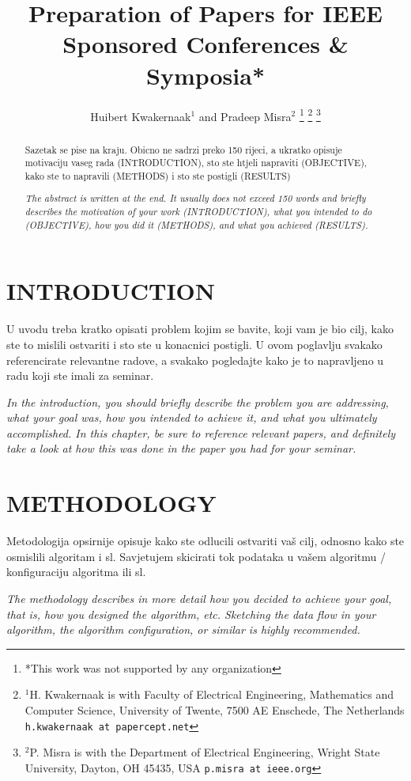 \documentclass[letterpaper, 10 pt, conference]{ieeeconf}  %
\title{\LARGE \bf
Preparation of Papers for IEEE Sponsored Conferences \& Symposia*
}
\author{Huibert Kwakernaak$^{1}$ and Pradeep Misra$^{2}$%
\thanks{*This work was not supported by any organization}%
\thanks{$^{1}$H. Kwakernaak is with Faculty of Electrical Engineering, Mathematics and Computer Science,
        University of Twente, 7500 AE Enschede, The Netherlands
        {\tt\small h.kwakernaak at papercept.net}}%
\thanks{$^{2}$P. Misra is with the Department of Electrical Engineering, Wright State University,
        Dayton, OH 45435, USA
        {\tt\small p.misra at ieee.org}}%
}
\begin{document}
\maketitle
\thispagestyle{empty}
\pagestyle{empty}


\begin{abstract}

Sazetak se pise na kraju. Obicno ne sadrzi preko 150 rijeci, a ukratko opisuje motivaciju vaseg rada (INTRODUCTION), sto ste htjeli napraviti (OBJECTIVE), kako ste to napravili (METHODS) i sto ste postigli (RESULTS)

\textit{The abstract is written at the end. It usually does not exceed 150 words and briefly describes the motivation of your work (INTRODUCTION), what you intended to do (OBJECTIVE), how you did it (METHODS), and what you achieved (RESULTS).}

\end{abstract}


\section{\textbf{INTRODUCTION}}

U uvodu treba kratko opisati problem kojim se bavite, koji vam je bio cilj, kako ste to mislili ostvariti i sto ste u konacnici postigli. U ovom poglavlju svakako referencirate relevantne radove, a svakako pogledajte kako je to napravljeno u radu koji ste imali za seminar.

\textit{In the introduction, you should briefly describe the problem you are addressing, what your goal was, how you intended to achieve it, and what you ultimately accomplished. In this chapter, be sure to reference relevant papers, and definitely take a look at how this was done in the paper you had for your seminar.}


\section{\textbf{METHODOLOGY}}

Metodologija opsirnije opisuje kako ste odlucili ostvariti vaš cilj, odnosno kako ste osmislili algoritam i sl. Savjetujem skicirati tok podataka u vašem algoritmu / konfiguraciju algoritma ili sl.

\textit{The methodology describes in more detail how you decided to achieve your goal, that is, how you designed the algorithm, etc. Sketching the data flow in your algorithm, the algorithm configuration, or similar is highly recommended.}
\end{document}
